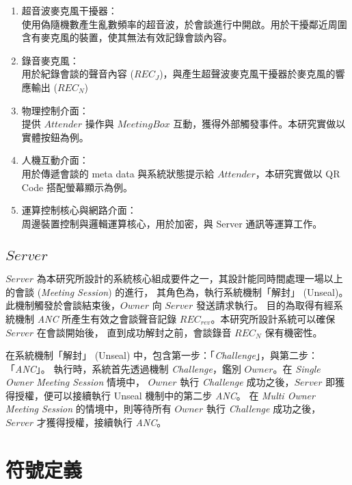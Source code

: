     \begin{enumerate}
        \item 超音波麥克風干擾器：\\
            使用偽隨機數產生亂數頻率的超音波，於會談進行中開啟。用於干擾鄰近周圍含有麥克風的裝置，使其無法有效記錄會談內容。

        \item 錄音麥克風：\\
            用於紀錄會談的聲音內容 ($REC_{J}$)，與產生超聲波麥克風干擾器於麥克風的響應輸出 ($REC_{N}$)

        \item 物理控制介面：\\
            提供 $Attender$ 操作與 $MeetingBox$ 互動，獲得外部觸發事件。本研究實做以實體按鈕為例。

        \item 人機互動介面：\\
            用於傳遞會談的 meta data 與系統狀態提示給 $Attender$，本研究實做以 QR Code 搭配螢幕顯示為例。

        \item 運算控制核心與網路介面：\\
            周邊裝置控制與邏輯運算核心，用於加密，與 Server 通訊等運算工作。
    \end{enumerate}


\subsection{$Server$}

    $Server$ 為本研究所設計的系統核心組成要件之一，其設計能同時間處理一場以上的會談 ({\it Meeting Session}) 的進行，
其角色為，執行系統機制「解封」 (Unseal)。此機制觸發於會談結束後，$Owner$ 向 $Server$ 發送請求執行。
目的為取得有經系統機制 {\it ANC} 所產生有效之會談聲音記錄 $REC_{rev}$。本研究所設計系統可以確保 $Server$ 在會談開始後，
直到成功解封之前，會談錄音 $REC_{N}$ 保有機密性。

    在系統機制「解封」 (Unseal) 中，包含第一步：「{\it Challenge}」，與第二步：「{\it ANC}」。
執行時，系統首先透過機制 {\it Challenge}，鑑別 $Owner$。在 {\it Single Owner Meeting Session} 情境中，
$Owner$ 執行 {\it Challenge} 成功之後，$Server$ 即獲得授權，便可以接續執行 Unseal 機制中的第二步 {\it ANC}。
在 {\it Multi Owner Meeting Session} 的情境中，則等待所有 $Owner$ 執行 {\it Challenge} 成功之後，
$Server$ 才獲得授權，接續執行 {\it ANC}。


\section{符號定義}

